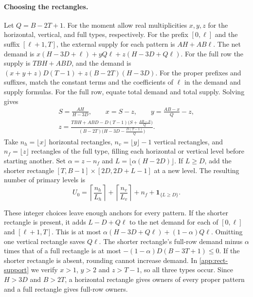 \documentclass[10pt]{article}
\numberwithin{equation}{section}
\theoremstyle{definition}
\begin{document}
\paragraph{Choosing the rectangles.}
Let $Q=B-2T+1$. For the moment allow real multiplicities $x,y,z$ for the horizontal, vertical, and full types, respectively. For the prefix $[0,\ell]$ and the suffix $[\ell+1,T]$, the external supply for each pattern is $AH+AB\ell$. The net demand is $x(H-3D+\ell)+yQ\ell+z(H-3D+Q\ell)$. For the full row the supply is $TBH+ABD$, and the demand is $(x+y+z)D(T-1)+z(B-2T)(H-3D)$. For the proper prefixes and suffixes, match the constant terms and the coefficients of $\ell$ in the demand and supply formulas. For the full row, equate total demand and total supply. Solving gives
\begin{equation}\label{eq:rect-calibration}
\begin{gathered}
 S=\frac{AH}{H-3D},\qquad x=S-z,\qquad y=\frac{AB-x}{Q}-z,\\[2pt]
 z=\frac{TBH+ABD-D(T-1)\bigl(S+\tfrac{AB-S}{Q}\bigr)}
 {(B-2T)\bigl(H-3D-\tfrac{D(T-1)}{Q}\bigr)}.
\end{gathered}
\end{equation}
Take $n_h=\lfloor x\rfloor$ horizontal rectangles, $n_v=\lfloor y\rfloor-1$ vertical rectangles, and $n_f=\lfloor z\rfloor$ rectangles of the full type, filling each horizontal or vertical level before starting another. Set $\alpha=z-n_f$ and $L=\lfloor\alpha(H-2D)\rfloor$. If $L\ge D$, add the shorter rectangle $[T,B-1]\times[2D,2D+L-1]$ at a new level. The resulting number of primary levels is
\begin{equation}\label{eq:rect-level-count}
 U_0=\left\lceil\frac{n_h}{L_h}\right\rceil
     +\left\lceil\frac{n_v}{L_v}\right\rceil+n_f+\mathbf 1_{\{L\ge D\}}.
\end{equation}

These integer choices leave enough anchors for every pattern. If the shorter rectangle is present, it adds $L-D+Q\ell$ to the net demand for each of $[0,\ell]$ and $[\ell+1,T]$. This is at most $\alpha(H-3D+Q\ell)+(1-\alpha)Q\ell$. Omitting one vertical rectangle saves $Q\ell$. The shorter rectangle's full-row demand minus $\alpha$ times that of a full rectangle is at most $-(1-\alpha)D(B-3T+1)\le0$. If the shorter rectangle is absent, rounding cannot increase demand. In \cref{app:rect-support} we verify $x>1$, $y>2$ and $z>T-1$, so all three types occur. Since $H>3D$ and $B>2T$, a horizontal rectangle gives owners of every proper pattern and a full rectangle gives full-row owners.
\end{document}

